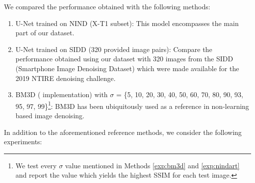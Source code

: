 
We compared the performance obtained with the following methods:

\begin{enumerate}
\itemsep0em 
  \item\label{exp:nindxt1} U-Net trained on \ac{NIND} (X-T1 subset):\newline
  This model encompasses the main part of our dataset.
  \item\label{exp:sidd} U-Net trained on \ac{SIDD} (320 provided image pairs):\newline
  Compare the performance obtained using our dataset with 320 images from the \ac{SIDD} (Smartphone Image Denoising Dataset) \cite{sidd} which were made available for the 2019 NTIRE denoising challenge.
  \item\label{exp:bm3d} \ac{BM3D} \cite{bm3d} ( \cite{bm3d-gpu} implementation) with $\sigma$ = \{5, 10, 20, 30, 40, 50, 60, 70, 80, 90, 93, 95, 97, 99\}\footnote{\label{sigmanote}We test every $\sigma$ value mentioned in Methods \ref{exp:bm3d} and \ref{exp:nindart} and report the value which yields the highest \ac{SSIM} for each test image.}:\newline
  BM3D has been ubiquitously used as a reference in non-learning based image denoising.
\end{enumerate}
In addition to the aforementioned reference methods, we consider the following experiments:

